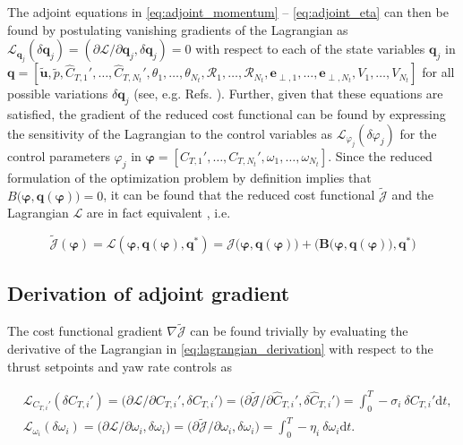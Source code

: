 \documentclass[energies,article,submit,moreauthors,latex,10pt,a4paper]{mdpi}
\newcommand{\revision}[1]{{\color{red} #1}}
\newcommand{\bs}[1]{\boldsymbol{#1}}
\newcommand{\dt}{\text{d}t}
\newcommand{\Tint}{\int_{0}^{T}}
\newcommand{\utilde}{\widetilde{\bs{u}}}
\newcommand{\ptilde}{\widetilde{p}}
\newcommand{\ctnhat}[1]{\widehat{C}_{T,#1}'}
\newcommand{\ctihat}{\widehat{C}_{T,i}'}
\newcommand{\cti}{C_{T,i}'}
\newcommand{\ctn}[1]{C_{T,#1}'}
\newcommand{\R}{\mathscr{R}}
\newcommand{\J}{\mathscr{J}}
\newcommand{\Jtilde}{\tilde{\mathscr{J}}}
\newcommand{\Lagr}{\mathscr{L}}
\newcommand{\eperpn}[1]{\bs{e}_{\perp,#1}}
\newcommand{\innerproduct}[2]{\bigg( #1, #2 \bigg)}
\newcommand{\innerproductsmall}[2]{\big( #1, #2 \big)}
\begin{document}
\noindent The adjoint equations in \eqref{eq:adjoint_momentum} -- \eqref{eq:adjoint_eta} can then be found by postulating vanishing gradients of the Lagrangian as  $\mathscr{L}_{\bs{q}_j}(\delta \bs{q}_j) = (\partial \mathscr{L}/\partial \bs{q}_j, \delta \bs{q}_j) = 0$ with respect to each of the state variables \revision{$\bs{q}_j$ in $\bs{q} = [\utilde, \ptilde, \ctnhat{1}, \dots, \ctnhat{N_t}, \theta_1, \dots, \theta_{N_t}, \R_1, \dots, \R_{N_t}, \eperpn{1}, \dots, \eperpn{N_t}, V_1, \dots, V_{N_t}]$} for all possible variations $\delta \bs{q}_j$ (see, e.g. Refs. \cite{troltzsch,borzinschulz,hinze2008optimization}).  Further, given that these equations are satisfied, the gradient of the reduced cost functional can be found by expressing the sensitivity of the Lagrangian to the control variables as $\Lagr_{\varphi_j}(\delta \varphi_j)$ for the control parameters $\varphi_j$ in $\bs{\varphi} = [\ctn{1}, \dots, \ctn{N_t}, \omega_1, \dots, \omega_{N_t}]$. 
Since the reduced formulation of the optimization problem by definition implies that $B\big(\bs{\varphi}, \bs{q}(\bs{\varphi})\big)=0$, it can be found that the reduced cost functional $\Jtilde$ and the Lagrangian $\Lagr$ are in fact equivalent \cite{hinze2008optimization}, i.e.

\begin{equation}
\Jtilde(\bs{\varphi}) = \Lagr(\bs{\varphi}, \bs{q}(\bs{\varphi}), \bs{q}^*) = \J\big(\bs{\varphi}, \bs{q}(\bs{\varphi})\big) + \innerproduct{\bs{B}\big(\bs{\varphi}, \bs{q}(\bs{\varphi})\big)}{\bs{q}^*}
\end{equation}


\subsection{Derivation of adjoint gradient}\label{sec:app_adj_grad}
\noindent The cost functional gradient $\nabla \Jtilde$ can be found trivially by evaluating the derivative of the Lagrangian in \eqref{eq:lagrangian_derivation} with respect to the thrust setpoints and yaw rate controls as 

\begin{align}
&\Lagr_{\cti}(\delta\cti) = \innerproductsmall{\partial \Lagr /\partial \cti}{\delta \cti} = \big(\partial \Jtilde/\partial \ctihat, \delta \ctihat \big)= \Tint -\sigma_i \ \delta \cti \dt, \label{eq:app_adjoint_grad_sigma}\\
&\Lagr_{\omega_i}(\delta\omega_i) = \innerproductsmall{\partial \Lagr /\partial \omega_i}{\delta \omega_i} =\big( \partial \Jtilde/\partial \omega_i, \delta \omega_i \big)= \Tint -\eta_i \ \delta \omega_i \dt. \label{eq:app_adjoint_grad_eta}
\end{align}
\end{document}
